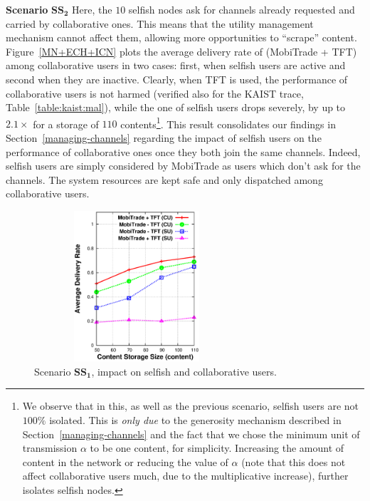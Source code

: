 \textbf{Scenario} $\mathbf{SS_2}$ Here, the $10$ selfish nodes ask for channels already requested and carried by collaborative ones. This means that the utility management mechanism cannot affect them, allowing more opportunities to ``scrape'' content. Figure~\ref{MN+ECH+ICN} plots the average delivery rate of (MobiTrade + TFT) among collaborative users in two cases: first, when selfish users are active and second when they are inactive. Clearly, when TFT is used, the performance of collaborative users is not harmed (verified also for the KAIST trace, Table~\ref{table:kaist:mal}), while the one of selfish users drops severely, by up to $2.1\times$ for a storage of $110$ contents\footnote{We observe that in this, as well as the previous scenario, selfish users are not $100\%$ isolated. This is \emph{only due} to the generosity mechanism described in Section~\ref{managing-channels} and the fact that we chose the minimum unit of transmission $\alpha$ to be one content, for simplicity. Increasing the amount of content in the network or reducing the value of $\alpha$ (note that this does not affect collaborative users much, due to the multiplicative increase), further isolates selfish nodes.}. This result consolidates our findings in Section~\ref{managing-channels} regarding the impact of selfish users on the performance of collaborative ones once they both join the same channels. Indeed, selfish users are simply considered by MobiTrade as users which don't ask for the channels. The system resources are kept safe and only dispatched among collaborative users.

\begin{figure}[!h]
  \begin{center}
    \includegraphics[width=3in,height=2.2in]{Chapitre5/fig1.eps}
  \end{center}
  \caption{Scenario $\mathbf{SS_1}$, impact on selfish and collaborative users.}
  \label{SS-Scenario-1}
\end{figure}


